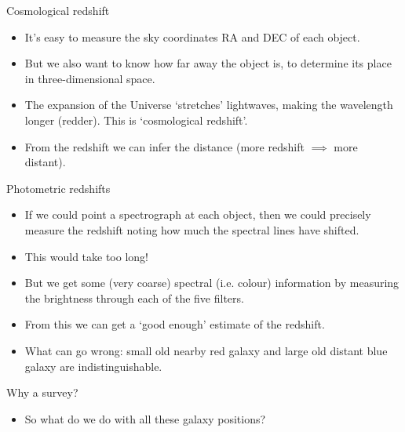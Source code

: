 \documentclass[usenames,dvipsnames]{beamer}
\begin{document}
\begin{frame}{Cosmological redshift}
  \begin{block}{}
    \begin{itemize}
      \item{It's easy to measure the sky coordinates RA and DEC of each object.}
      \item{But we also want to know how far away the object is, to determine its place in three-dimensional space.}
      \item{The expansion of the Universe `stretches' lightwaves, making the wavelength longer (redder). This is `cosmological redshift'.}
      \item{From the redshift we can infer the distance (more redshift $\implies$ more distant).}
    \end{itemize}
  \end{block}
\end{frame}


\begin{frame}{Photometric redshifts}
  \begin{block}{}
    \begin{itemize}
      \item{If we could point a spectrograph at each object, then we could precisely measure the redshift noting how much the spectral lines have shifted.}
      \item{This would take too long!}
      \item{But we get some (very coarse) spectral (i.e. colour) information by measuring the brightness through each of the five filters.}
      \item{From this we can get a `good enough' estimate of the redshift.}
      \item{What can go wrong: small old nearby red galaxy and large old distant blue galaxy are indistinguishable.}
    \end{itemize}
  \end{block}
\end{frame}

\begin{frame}{Why a survey?}
  \begin{block}{}
    \begin{itemize}
      \item{So what do we do with all these galaxy positions?}
    \end{itemize}
  \end{block}
\end{frame}
\end{document}
